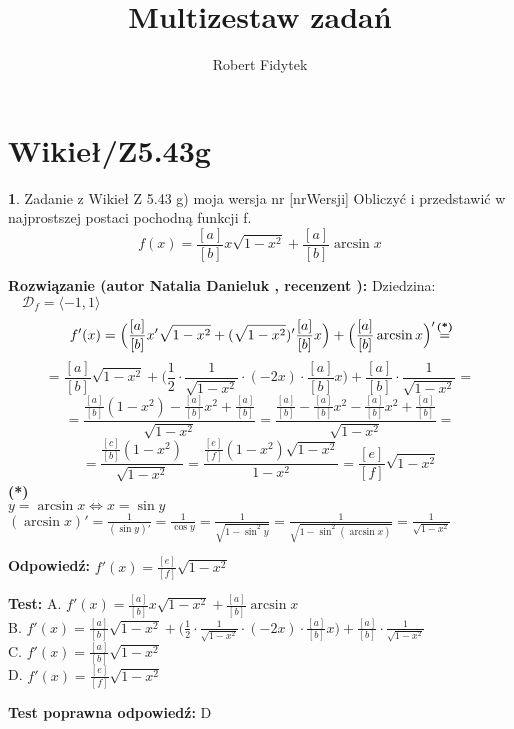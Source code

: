\documentclass[12pt, a4paper]{article}
\title{Multizestaw zadań}
\author{Robert Fidytek}
\date{}
\theoremstyle{definition} %
\newtheorem{zad}{}
\newcommand{\kategoria}[1]{\section{#1}} %
\newcommand{\zadStart}[1]{\begin{zad}#1\newline} %
\newcommand{\zadStop}{\end{zad}}   %
\newcommand{\rozwStart}[2]{\noindent \textbf{Rozwiązanie (autor #1 , recenzent #2): }\newline} %
\newcommand{\rozwStop}{\newline}                                            %
\newcommand{\odpStart}{\noindent \textbf{Odpowiedź:}\newline}    %
\newcommand{\odpStop}{\newline}                                             %
\newcommand{\testStart}{\noindent \textbf{Test:}\newline} %
\newcommand{\testStop}{\newline} %
\newcommand{\kluczStart}{\noindent \textbf{Test poprawna odpowiedź:}\newline} %
\newcommand{\kluczStop}{\newline} %
\begin{document}
\maketitle

\kategoria{Wikieł/Z5.43g}

\zadStart{Zadanie z Wikieł Z 5.43 g) moja wersja nr [nrWersji]}
Obliczyć i przedstawić w najprostszej postaci pochodną funkcji f.
$$f(x) = \frac{[a]}{[b]}x\sqrt{1 - x^2} + \frac{[a]}{[b]}\arcsin x$$
\zadStop

\rozwStart{Natalia Danieluk}{}
Dziedzina: $\quad \mathcal{D}_f=\langle -1, 1 \rangle$
$$f'(x) = \Big(\frac{[a]}{[b]}x'\sqrt{1 - x^2} + (\sqrt{1 - x^2})'\frac{[a]}{[b]}x\Big) + \Big(\frac{[a]}{[b]}\arcsin x\Big)' 
\mathrel{\stackrel{\makebox[0pt]{\mbox{\normalfont\scriptsize\textbf{(*)}}}}{=}}$$ 
$$= \frac{[a]}{[b]}\sqrt{1 - x^2} + \Big(\frac{1}{2} \cdot \frac{1}{\sqrt{1 - x^2}} \cdot (-2x) \cdot \frac{[a]}{[b]}x\Big) + \frac{[a]}{[b]}\cdot \frac{1}{\sqrt{1 - x^2}} =$$
$$= \frac{\frac{[a]}{[b]}(1 - x^2) - \frac{[a]}{[b]}x^2 + \frac{[a]}{[b]}}{\sqrt{1 - x^2}} = \frac{\frac{[a]}{[b]} - \frac{[a]}{[b]}x^2 - \frac{[a]}{[b]}x^2 + \frac{[a]}{[b]}}{\sqrt{1 - x^2}} =$$
$$= \frac{\frac{[c]}{[b]}(1 - x^2)}{\sqrt{1 - x^2}} = \frac{\frac{[e]}{[f]}(1 - x^2)\sqrt{1 - x^2}}{1 - x^2} = \frac{[e]}{[f]}\sqrt{1 - x^2}$$
{\normalfont\scriptsize\textbf{(*)}\\
$y = \arcsin x \Leftrightarrow x = \sin y$\\
$(\arcsin x)' = \frac{1}{(\sin y)'} = \frac{1}{\cos y} = \frac{1}{\sqrt{1 - \sin^2 y}} = \frac{1}{\sqrt{1 - \sin^2 (\arcsin x)}} = \frac{1}{\sqrt{1 - x^2}}$}
\rozwStop

\odpStart
$f'(x) = \frac{[e]}{[f]}\sqrt{1 - x^2}$
\odpStop

\testStart
A. $f'(x) = \frac{[a]}{[b]}x\sqrt{1 - x^2} + \frac{[a]}{[b]}\arcsin x$\\
B. $f'(x) = \frac{[a]}{[b]}\sqrt{1 - x^2} + \Big(\frac{1}{2} \cdot \frac{1}{\sqrt{1 - x^2}} \cdot (-2x) \cdot \frac{[a]}{[b]}x\Big) + \frac{[a]}{[b]}\cdot \frac{1}{\sqrt{1 - x^2}}$\\
C. $f'(x) = \frac{[a]}{[b]}\sqrt{1 - x^2}$\\
D. $f'(x) = \frac{[e]}{[f]}\sqrt{1 - x^2}$
\testStop

\kluczStart
D
\kluczStop
\end{document}
